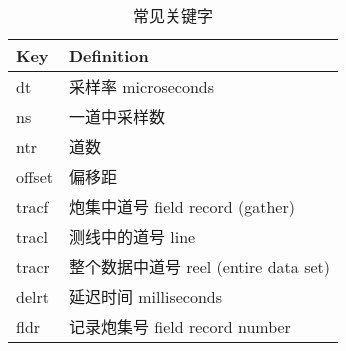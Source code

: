 \begin{table}[h]
	\centering
	\begin{tabular}{ll}
		\toprule
		Key & Definition \\
		\midrule
		dt &  采样率 microseconds \\ 
		ns &  一道中采样数 \\
		ntr & 道数 \\
		offset & 偏移距 \\
		tracf & 炮集中道号 field record (gather) \\
		tracl & 测线中的道号 line \\
		tracr & 整个数据中道号 reel (entire data set) \\
		delrt & 延迟时间 milliseconds \\
		fldr  & 记录炮集号 field record number\\
		\bottomrule
	\end{tabular}\\
	\caption{常见关键字}                   
\end{table}

